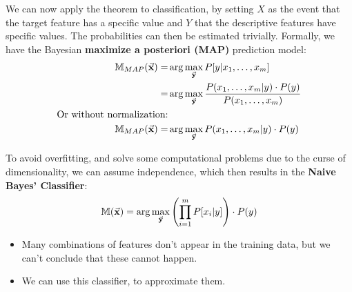 We can now apply the theorem to classification, by setting $X$ as the event that the target feature has a specific value and $Y$ that the descriptive features have specific values. The probabilities can then be estimated trivially. Formally, we have the Bayesian \textbf{maximize a posteriori (MAP)} prediction model:
\begin{align*}
  \mathbb{M}_{MAP}(\vec{\mathbf{x}}) =& \arg\max_{\vec{\mathbf{y}}} P[y|x_1, \dots, x_m]\\
  =& \arg\max_{\vec{\mathbf{y}}} \frac{P(x_1, \dots, x_m | y) \cdot P(y)}{P(x_1, \dots, x_m)}\\
  \textnormal{\color{black}{Or without normalization:}}\\
  \mathbb{M}_{MAP}(\vec{\mathbf{x}}) =& \arg\max_{\vec{\mathbf{y}}} P(x_1, \dots, x_m | y) \cdot P(y)\\
\end{align*}

To avoid overfitting, and solve some computational problems due to the curse of dimensionality, we can assume independence, which then results in the \textbf{Naive Bayes' Classifier}:
\begin{align*}
  \mathbb{M}(\vec{\mathbf{x}}) = \arg\max_{\vec{\mathbf{y}}}\left(\prod_{i=1}^m P[x_i | y]\right) \cdot P(y)
\end{align*}
\begin{itemize}
  \item Many combinations of features don't appear in the training data, but we can't conclude that these cannot happen.
  \item We can use this classifier, to approximate them.
\end{itemize}
